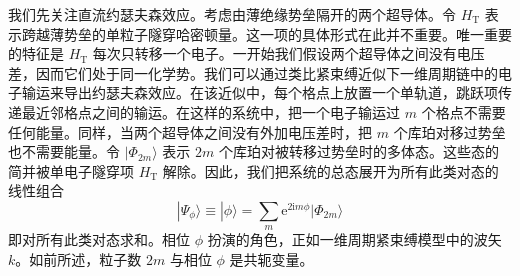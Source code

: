 我们先关注直流约瑟夫森效应。考虑由薄绝缘势垒隔开的两个超导体。令 $H_{\mathrm{T}}$ 表示跨越薄势垒的单粒子隧穿哈密顿量。这一项的具体形式在此并不重要。唯一重要的特征是 $H_{\mathrm{T}}$ 每次只转移一个电子。一开始我们假设两个超导体之间没有电压差，因而它们处于同一化学势。我们可以通过类比紧束缚近似下一维周期链中的电子输运来导出约瑟夫森效应。在该近似中，每个格点上放置一个单轨道，跳跃项传递最近邻格点之间的输运。在这样的系统中，把一个电子输运过 $m$ 个格点不需要任何能量。同样，当两个超导体之间没有外加电压差时，把 $m$ 个库珀对移过势垒也不需要能量。令 $|\Phi_{2m}\rangle$ 表示 $2m$ 个库珀对被转移过势垒时的多体态。这些态的简并被单电子隧穿项 $H_{\mathrm{T}}$ 解除。因此，我们把系统的总态展开为所有此类对态的线性组合
\begin{equation*}
|\Psi_{\phi}\rangle\equiv|\phi\rangle=\sum_{m}\mathrm{e}^{2\mathrm{i}m\phi}|\Phi_{2m}\rangle\tag{12.320}
\end{equation*}
即对所有此类对态求和。相位 $\phi$ 扮演的角色，正如一维周期紧束缚模型中的波矢 $k$。如前所述，粒子数 $2m$ 与相位 $\phi$ 是共轭变量。

